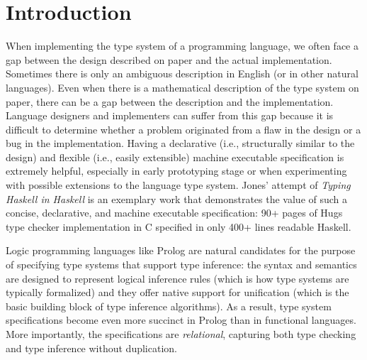 \section{Introduction}\label{sec:intro}
When implementing the type system of a programming language, we often face
a gap between the design described on paper and the actual implementation.
Sometimes there is only an ambiguous description in English (or in other
natural languages). Even when there is a mathematical description of
the type system on paper, there can be a gap between the description and
the implementation. Language designers and implementers can suffer from
this gap because it is difficult to determine whether a problem originated
from a flaw in the design or a bug in the implementation.
Having a declarative (i.e., structurally similar to the design)
and flexible (i.e., easily extensible) machine executable specification
is extremely helpful, especially in early prototyping stage or
when experimenting with possible extensions to the language type system.  
Jones' attempt of \emph{Typing Haskell in Haskell} \cite{JonesTHiH99} is
an exemplary work that demonstrates the value of such a concise, declarative,
and machine executable specification: 90+ pages of Hugs type checker
implementation in C specified in only 400+ lines readable Haskell.

Logic programming languages like Prolog are natural candidates for
the purpose of specifying type systems that support type inference:
the syntax and semantics are designed to represent logical inference rules
(which is how type systems are typically formalized) and they offer native
support for unification (which is the basic building block of type inference
algorithms). As a result, type system specifications become even more succinct
in Prolog than in functional languages. More importantly, the specifications
are \emph{relational}, capturing both type checking and type inference
without duplication.

